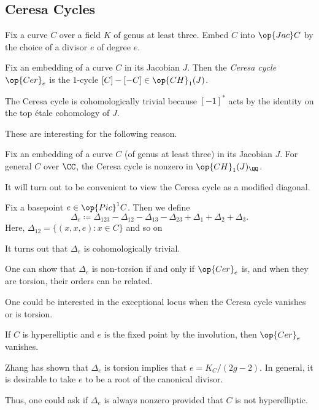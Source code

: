 \documentclass{article}
\begin{document}
\subsection{Ceresa Cycles}
Fix a curve $C$ over a field $K$ of genus at least three. Embed $C$ into $\op{Jac}C$ by the choice of a divisor $e$ of degree $e$.
\begin{definition}
	Fix an embedding of a curve $C$ in its Jacobian $J$. Then the \textit{Ceresa cycle} $\op{Cer}_e$ is the $1$-cycle $[C]-[-C]\in\op{CH}_1(J)$.
\end{definition}
\begin{remark}
	The Ceresa cycle is cohomologically trivial because $[-1]^*$ acts by the identity on the top \'etale cohomology of $J$.
\end{remark}
These are interesting for the following reason.
\begin{theorem}[Ceresa]
	Fix an embedding of a curve $C$ (of genus at least three) in its Jacobian $J$. For general $C$ over $\CC$, the Ceresa cycle is nonzero in $\op{CH}_1(J)_\QQ$.
\end{theorem}
It will turn out to be convenient to view the Ceresa cycle as a modified diagonal.
\begin{notation}
	Fix a basepoint $e\in\op{Pic}^1C$. Then we define
	\[\Delta_e\coloneqq\Delta_{123}-\Delta_{12}-\Delta_{13}-\Delta_{23}+\Delta_1+\Delta_2+\Delta_3.\]
	Here, $\Delta_{12}=\{(x,x,e):x\in C\}$ and so on
\end{notation}
\begin{remark}
	It turns out that $\Delta_e$ is cohomologically trivial.
\end{remark}
\begin{remark}
	One can show that $\Delta_e$ is non-torsion if and only if $\op{Cer}_e$ is, and when they are torsion, their orders can be related.
\end{remark}
One could be interested in the exceptional locus when the Ceresa cycle vanishes or is torsion.
\begin{example}
	If $C$ is hyperelliptic and $e$ is the fixed point by the involution, then $\op{Cer}_e$ vanishes.
\end{example}
\begin{remark}
	Zhang has shown that $\Delta_e$ is torsion implies that $e=K_C/(2g-2)$. In general, it is desirable to take $e$ to be a root of the canonical divisor.
\end{remark}
Thus, one could ask if $\Delta_e$ is always nonzero provided that $C$ is not hyperelliptic.
\end{document}
